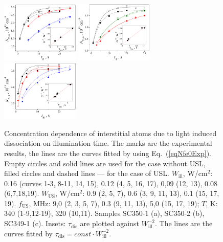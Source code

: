 \documentclass[%
 aip,jap,
 amsmath,amssymb,
 reprint,%
]{revtex4-1}
\begin{document}
\begin{figure}
\includegraphics[width=0.33\textwidth]{Fig4a}%
\includegraphics[width=0.33\textwidth]{Fig4b}%
\includegraphics[width=0.33\textwidth]{Fig4c}%
\caption{\label{Fig:Nfe_till}
Concentration dependence of interstitial atoms due to light induced dissociation on illumination time. 
The marks are the experimental results, the lines are the curves  fitted by using Eq.~(\ref{eqNfe0Exp}). 
Empty circles and solid lines are used for  the case without USL, 
filled circles and dashed lines --- for the case of USL. 
$W_\mathrm{ill}$, W/cm$^2$: 0.16 (curves 1-3, 8-11, 14, 15), 
0.12 (4, 5, 16, 17), 0,09 (12, 13), 0.08 (6,7,18,19). 
$W_\mathrm{US}$, W/cm$^2$: 
0.9 (2, 5, 7), 0.6 (3, 9, 11, 13), 0.1 (15, 17, 19). 
$f_\mathrm{US}$, MHz: 
9,0 (2, 3, 5, 7), 0.3 (9, 11, 13), 5,0 (15, 17, 19); 
$T$, K: 
340 (1-9,12-19), 320 (10,11). 
Samples SC350-1 (a), SC350-2 (b), SC349-1 (c). 
Insets: $\tau_\mathrm{dis}$ are plotted against $W_\mathrm{ill}^{-2}$. 
The lines are the curves fitted by $\tau_\mathrm{dis}=const\cdot W_\mathrm{ill}^{-2}$.
}
\end{figure}
\end{document}
